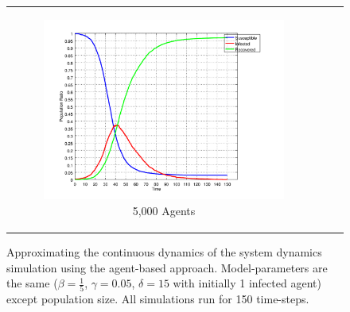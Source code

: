 \begin{figure}
\begin{center}
\begin{tabular}{c c c}
\begin{subfigure}[b]{0.3\textwidth}
			\centering
			\includegraphics[width=1\textwidth, angle=0]{./../shared/fig/frabs/SIR_5000agents_150t_01dt_parallel.png}
			\caption{5,000 Agents}
			\label{fig:sir_abs_approximating_5000}
		\end{subfigure}
	\end{tabular}
	
	\caption{Approximating the continuous dynamics of the system dynamics simulation using the agent-based approach. Model-parameters are the same ($\beta = \frac{1}{5}$, $\gamma = 0.05$, $\delta = 15$ with initially 1 infected agent) except population size. All simulations run for 150 time-steps.} 
	\label{fig:sir_abs_approximating}
\end{center}
\end{figure}

